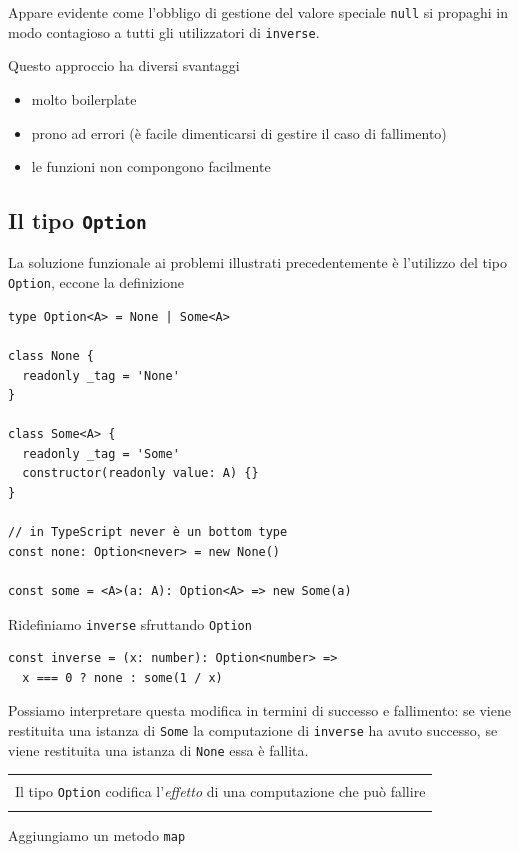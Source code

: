 \documentclass[12pt]{article}
\newenvironment{demo}
    {\begin{center}
    \begin{tabular}{|p{0.9\textwidth}|}
    \hline\\
    }
    {
    \\\\\hline
    \end{tabular}
    \end{center}
    }
\begin{document}
Appare evidente come l'obbligo di gestione del valore speciale \texttt{null} si propaghi in modo contagioso
a tutti gli utilizzatori di \texttt{inverse}.

Questo approccio ha diversi svantaggi

\begin{itemize}
  \item molto boilerplate
  \item prono ad errori (è facile dimenticarsi di gestire il caso di fallimento)
  \item le funzioni non compongono facilmente
\end{itemize}

\subsection{Il tipo \texttt{Option}}

La soluzione funzionale ai problemi illustrati precedentemente è l'utilizzo del tipo \texttt{Option},
eccone la definizione

\begin{verbatim}
type Option<A> = None | Some<A>

class None {
  readonly _tag = 'None'
}

class Some<A> {
  readonly _tag = 'Some'
  constructor(readonly value: A) {}
}

// in TypeScript never è un bottom type
const none: Option<never> = new None()

const some = <A>(a: A): Option<A> => new Some(a)
\end{verbatim}

Ridefiniamo \texttt{inverse} sfruttando \texttt{Option}

\begin{verbatim}
const inverse = (x: number): Option<number> =>
  x === 0 ? none : some(1 / x)
\end{verbatim}

Possiamo interpretare questa modifica in termini di successo e fallimento: se viene restituita una istanza di \texttt{Some}
la computazione di \texttt{inverse} ha avuto successo, se viene restituita una istanza di \texttt{None} essa è fallita.

\begin{demo}
Il tipo \texttt{Option} codifica l'\emph{effetto} di una computazione che può fallire
\end{demo}

Aggiungiamo un metodo \texttt{map}
\end{document}
